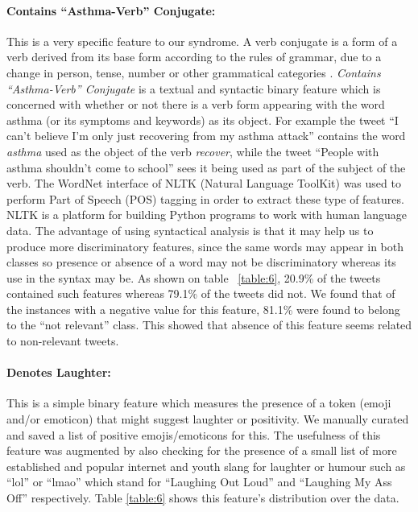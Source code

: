 \documentclass[10pt,letterpaper]{article}
\begin{document}
\paragraph{ \textbf{Contains ``Asthma-Verb'' Conjugate:} } This is a very specific feature to our syndrome.  A verb conjugate is a form of a verb derived from its base form according to the rules of grammar, due to a change in person, tense, number or other grammatical categories \cite{REF19}. \textit{Contains ``Asthma-Verb'' Conjugate} is a textual and syntactic binary feature which is concerned with whether or not there is a verb form appearing with the word asthma (or its symptoms and keywords) as its object. For example the tweet ``I can't believe I'm only just recovering from my asthma attack'' contains the word \textit{asthma} used as the object of the verb \textit{recover}, while the tweet ``People with asthma shouldn't come to school'' sees it being used as part of the subject of the verb. The WordNet\cite{REF36} interface of NLTK (Natural Language ToolKit) was used to perform Part of Speech (POS) tagging in order to extract these type of features. NLTK is a platform for building Python programs to work with human language data. The advantage of using syntactical analysis is that it may help us to produce more discriminatory features, since the same words may appear in both classes so presence or absence of a word may not be discriminatory whereas its use in the syntax may be.   As shown on table~ \ref{table:6}, 20.9\% of the tweets contained such features whereas 79.1\% of the tweets did not. We found that of the instances with a negative value for this feature, 81.1\% were found to belong to the ``not relevant'' class. This showed that absence of this feature seems related to non-relevant tweets.

\paragraph{ \textbf{Denotes Laughter:}} This is a simple binary feature which measures the presence of a token (emoji and/or emoticon) that might suggest laughter or positivity. We manually curated and saved a list of positive emojis/emoticons for this. The usefulness of this feature was augmented by also checking for the presence of a small list of more established and popular internet and youth slang for laughter or humour such as ``lol'' or ``lmao'' which stand for ``Laughing Out Loud'' and ``Laughing My Ass Off'' respectively. Table \ref{table:6} shows this feature's distribution over the data. 
\end{document}
